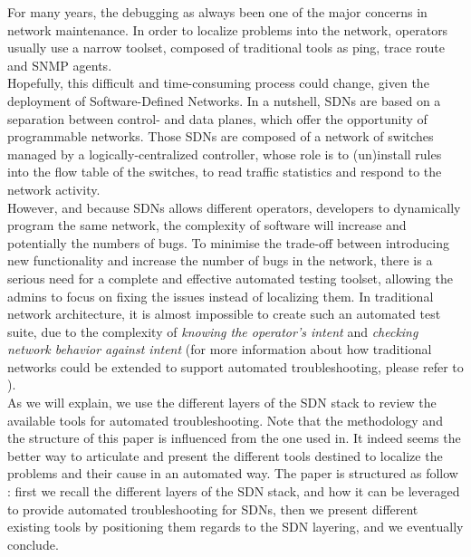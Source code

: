 \documentclass[10pt,article]{IEEEtran}
\begin{document}
For many years, the debugging as always been one of the major concerns in network maintenance. In order to localize problems into the network, operators usually use a narrow toolset, composed of traditional tools as ping, trace route and SNMP agents\cite{zeng2012automatic}.\\
Hopefully, this difficult and time-consuming\cite{zeng2012automatic} process could change, given the deployment of Software-Defined Networks. In a nutshell, SDNs are based on a separation between control- and data planes, which offer the opportunity of programmable networks\cite{mckeown2008openflow}. Those SDNs are composed of a network of switches managed by a logically-centralized controller, whose role is to (un)install rules into the flow table of the switches, to read traffic statistics and respond to the network activity.\\
However, and because SDNs allows different operators, developers to dynamically program the same network, the complexity of software will increase\cite{Sherwood:2010:PNT:1924943.1924969} and potentially the numbers of bugs.
To minimise the trade-off between introducing new functionality and  increase the number of bugs in the network, there is a serious need for a complete and effective automated testing toolset, allowing the admins to focus on fixing the issues instead of localizing them. In traditional network architecture, it is almost impossible to create such an automated test suite, due to the complexity of \textit{knowing the operator's intent} and \textit{checking network behavior against intent}\cite{Heller:2013:LSL:2491185.2491197} (for more information about how traditional networks could be extended to support automated troubleshooting, please refer to \cite{Heller:2013:LSL:2491185.2491197}).\\
As we will explain, we use the different layers of the SDN stack to review the available tools for automated troubleshooting. Note that the methodology and the structure of this paper is influenced from the one used in\cite{Heller:2013:LSL:2491185.2491197}. It indeed seems the better way to articulate and present the different tools destined to localize the problems and their cause in an automated way.
The paper is structured as follow : first we recall the different layers of the SDN stack, and how it can be leveraged to provide automated troubleshooting for SDNs, then we present different existing tools by positioning them regards to the SDN layering, and we eventually conclude.
\end{document}
